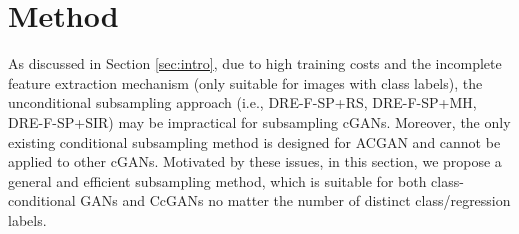 \documentclass[10pt, twocolumn]{article}
\theoremstyle{definition}
\begin{document}
\section{Method}\label{sec:method}

As discussed in Section \ref{sec:intro}, due to high training costs and the incomplete feature extraction mechanism (only suitable for images with class labels), the unconditional subsampling approach \cite{ding2020subsampling} (i.e., DRE-F-SP+RS, DRE-F-SP+MH, DRE-F-SP+SIR) may be impractical for subsampling cGANs. Moreover, the only existing conditional subsampling method \cite{mo2019mining} is designed for ACGAN \cite{odena2017conditional} and cannot be applied to other cGANs. Motivated by these issues, in this section, we propose a general and efficient subsampling method, which is suitable for both class-conditional GANs and CcGANs no matter the number of distinct class/regression labels. 
\end{document}
